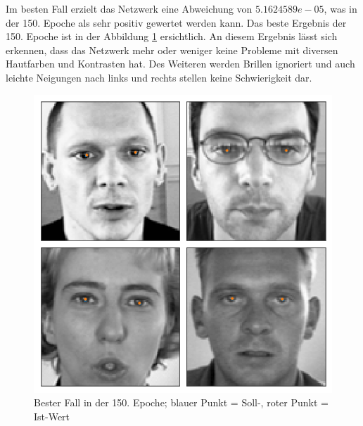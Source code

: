 \noindent
Im besten Fall erzielt das Netzwerk eine Abweichung von $5.1624589e-05$, was in der 150. Epoche als sehr positiv gewertet werden kann.
Das beste Ergebnis der 150. Epoche ist in der Abbildung \ref{fig:good} ersichtlich. 
An diesem Ergebnis lässt sich erkennen, dass das Netzwerk mehr oder weniger keine Probleme mit diversen Hautfarben und Kontrasten hat. 
Des Weiteren werden Brillen ignoriert und auch leichte Neigungen nach links und rechts stellen keine Schwierigkeit dar. 
\begin{figure}[ht!]
	\centering
	\includegraphics[scale=0.6]{images/Good_2.png}
	\caption{Bester Fall in der 150. Epoche; blauer Punkt = Soll-, roter Punkt = Ist-Wert}
	\label{fig:good}
\end{figure} \phantom \newline

